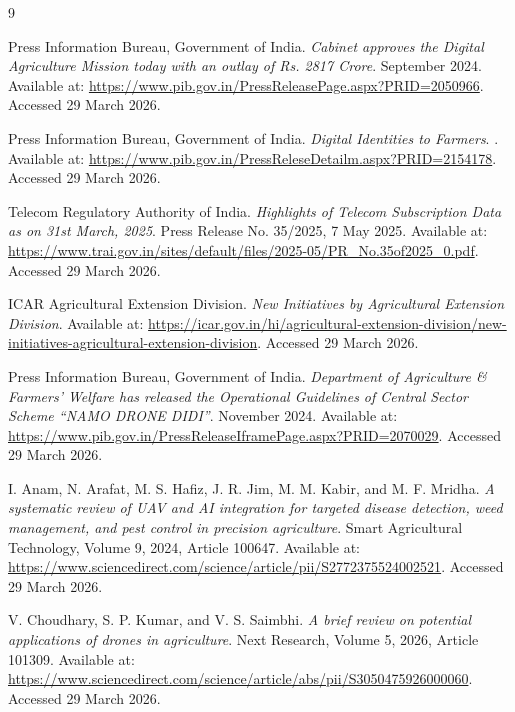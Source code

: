 \documentclass[11pt,a4paper]{article}
\begin{document}
\begin{thebibliography}{9}

Press Information Bureau, Government of India.
\newblock \emph{Cabinet approves the Digital Agriculture Mission today with an outlay of Rs. 2817 Crore}.
 September 2024.
\newblock Available at: \url{https://www.pib.gov.in/PressReleasePage.aspx?PRID=2050966}.
\newblock Accessed 29 March 2026.

Press Information Bureau, Government of India.
\newblock \emph{Digital Identities to Farmers}.
.
\newblock Available at: \url{https://www.pib.gov.in/PressReleseDetailm.aspx?PRID=2154178}.
\newblock Accessed 29 March 2026.

Telecom Regulatory Authority of India.
\newblock \emph{Highlights of Telecom Subscription Data as on 31st March, 2025}.
\newblock Press Release No. 35/2025, 7 May 2025.
\newblock Available at: \url{https://www.trai.gov.in/sites/default/files/2025-05/PR_No.35of2025_0.pdf}.
\newblock Accessed 29 March 2026.

ICAR Agricultural Extension Division.
\newblock \emph{New Initiatives by Agricultural Extension Division}.
\newblock Available at: \url{https://icar.gov.in/hi/agricultural-extension-division/new-initiatives-agricultural-extension-division}.
\newblock Accessed 29 March 2026.

Press Information Bureau, Government of India.
\newblock \emph{Department of Agriculture \& Farmers' Welfare has released the Operational Guidelines of Central Sector Scheme ``NAMO DRONE DIDI''}.
 November 2024.
\newblock Available at: \url{https://www.pib.gov.in/PressReleaseIframePage.aspx?PRID=2070029}.
\newblock Accessed 29 March 2026.

I. Anam, N. Arafat, M. S. Hafiz, J. R. Jim, M. M. Kabir, and M. F. Mridha.
\newblock \emph{A systematic review of UAV and AI integration for targeted disease detection, weed management, and pest control in precision agriculture}.
\newblock Smart Agricultural Technology, Volume 9, 2024, Article 100647.
\newblock Available at: \url{https://www.sciencedirect.com/science/article/pii/S2772375524002521}.
\newblock Accessed 29 March 2026.

V. Choudhary, S. P. Kumar, and V. S. Saimbhi.
\newblock \emph{A brief review on potential applications of drones in agriculture}.
\newblock Next Research, Volume 5, 2026, Article 101309.
\newblock Available at: \url{https://www.sciencedirect.com/science/article/abs/pii/S3050475926000060}.
\newblock Accessed 29 March 2026.

\end{thebibliography}
\end{document}
